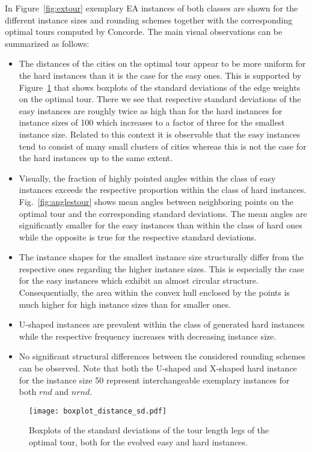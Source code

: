 \documentclass{article}
\begin{document}
In Figure~\ref{fig:extour} exemplary EA instances of both classes are
shown for the different instance sizes and rounding schemes together
with the corresponding optimal tours computed by Concorde. The main
visual observations can be summarized as follows:
\begin{itemize}
\item The distances of the cities on the optimal tour appear to be
  more uniform for the hard instances than it is the case for the easy
  ones. This is supported by Figure~\ref{fig:sdtour} that shows
  boxplots of the standard deviations of the edge weights on the
  optimal tour. There we see that respective standard deviations of
  the easy instances are roughly twice as high than for the hard
  instances for instance sizes of 100 which increases to a factor of
  three for the smallest instance size. Related to this context it is
  observable that the easy instances tend to consist of many small
  clusters of cities whereas this is not the case for the hard
  instances up to the same extent.
\item Visually, the fraction of highly pointed angles within the class
  of easy instances exceeds the respective proportion within the class
  of hard instances. Fig.~\ref{fig:anglestour} shows mean angles
  between neighboring points on the optimal tour and the corresponding
  standard deviations. The mean angles are significantly smaller for
  the easy instances than within the class of hard ones while the
  opposite is true for the respective standard deviations.
\item The instance shapes for the smallest instance size structurally
  differ from the respective ones regarding the higher instance
  sizes. This is especially the case for the easy instances which
  exhibit an almost circular structure. Consequentially, the area
  within the convex hull enclosed by the points is much higher for high instance sizes than for smaller ones.
\item U-shaped instances are prevalent within the class of generated
  hard instances while the respective frequency increases with
  decreasing instance size.
\item No significant structural differences between the considered
  rounding schemes can be observed. Note that both the U-shaped and
  X-shaped hard instance for the instance size 50 represent
  interchangeable exemplary instances for both $rnd$ and $nrnd$.
\end{itemize}

\begin{figure}
  \centering
\texttt{[image: boxplot\_distance\_sd.pdf]}
\caption{Boxplots of the standard deviations of the tour length legs
    of the optimal tour, both for the evolved easy and hard
    instances.}
  \label{fig:sdtour}
\end{figure}
\end{document}
